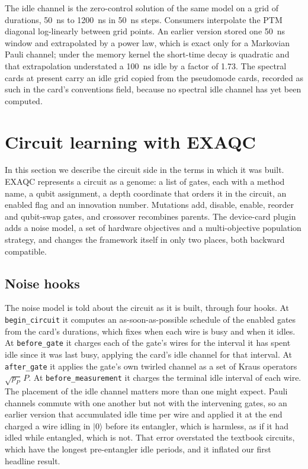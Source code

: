 \documentclass[10pt]{article}
\begin{document}
The idle channel is the zero-control solution of the same model on a grid of
durations, 50~ns to 1200~ns in 50~ns steps. Consumers interpolate the PTM
diagonal log-linearly between grid points. An earlier version stored one 50~ns
window and extrapolated by a power law, which is exact only for a Markovian
Pauli channel; under the memory kernel the short-time decay is quadratic and
that extrapolation understated a 100~ns idle by a factor of 1.73. The spectral
cards at present carry an idle grid copied from the pseudomode cards, recorded
as such in the card's conventions field, because no spectral idle channel has
yet been computed.

\section{Circuit learning with EXAQC}
\label{sec:ga}

In this section we describe the circuit side in the terms in which it was
built. EXAQC represents a circuit as a genome: a list of gates, each with a
method name, a qubit assignment, a depth coordinate that orders it in the
circuit, an enabled flag and an innovation number. Mutations add, disable,
enable, reorder and qubit-swap gates, and crossover recombines parents. The
device-card plugin adds a noise model, a set of hardware objectives and a
multi-objective population strategy, and changes the framework itself in only
two places, both backward compatible.

\subsection{Noise hooks}

The noise model is told about the circuit as it is built, through four hooks.
At \texttt{begin\_circuit} it computes an as-soon-as-possible schedule of the
enabled gates from the card's durations, which fixes when each wire is busy
and when it idles. At \texttt{before\_gate} it charges each of the gate's wires
for the interval it has spent idle since it was last busy, applying the card's
idle channel for that interval. At \texttt{after\_gate} it applies the gate's
own twirled channel as a set of Kraus operators $\sqrt{p_P}\,P$. At
\texttt{before\_measurement} it charges the terminal idle interval of each
wire. The placement of the idle channel matters more than one might expect.
Pauli channels commute with one another but not with the intervening gates, so
an earlier version that accumulated idle time per wire and applied it at the
end charged a wire idling in $|0\rangle$ before its entangler, which is
harmless, as if it had idled while entangled, which is not. That error
overstated the textbook circuits, which have the longest pre-entangler idle
periods, and it inflated our first headline result.
\end{document}
